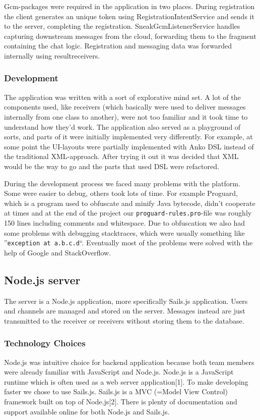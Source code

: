 Gcm-packages were required in the application in two places. During registration the client generates an unique token using RegistrationIntentService and sends it to the server, completing the registration. SneakGcmListenerService handles capturing downstream messages from the cloud, forwarding them to the fragment containing the chat logic. Registration and messaging data was forwarded internally using resultreceivers.

\subsubsection{Development}

The application was written with a sort of explorative mind set. A lot of the components used, like receivers (which basically were used to deliver messages internally from one class to another), were not too familiar and it took time to understand how they'd work. The application also served as a playground of sorts, and parts of it were initially implemented very differently. For example, at some point the UI-layouts were partially implemented with Anko DSL instead of the traditional XML-approach. After trying it out it was decided that XML would be the way to go and the parts that used DSL were refactored.

During the development process we faced many problems with the platform. Some were easier to debug, others took lots of time. For example Proguard, which is a program used to obfuscate and minify Java bytecode, didn't cooperate at times and at the end of the project our \verb|proguard-rules.pro|-file was roughly 150 lines including comments and whitespace. Due to obfuscation we also had some problems with debugging stacktraces, which were usually something like ''\verb|exception at a.b.c.d|``. Eventually most of the problems were solved with the help of Google and StackOverflow.

\subsection{Node.js server}
The server is a Node.js application, more specifically Sails.js application. Users and channels are managed and stored on the server. Messages instead are just transmitted to the receiver or receivers without storing them to the database. 

\subsubsection{Technology Choices}
Node.js was intuitive choice for backend application because both team members were already familiar with JavaScript and Node.js. Node.js is a JavaScript runtime which is often used as a web server application[1]. To make developing faster we chose to use Sails.js. Sails.js is a MVC (=Model View Control) framework built on top of Node.js[2]. There is plenty of documentation and support available online for both Node.js and Sails.js.

